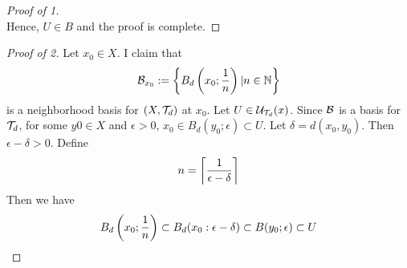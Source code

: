 \begin{prop}
\begin{proof}[Proof of 1]
\begin{equation}
        \end{equation}
        Hence, $U \in B$ and the proof is complete. 
    \end{proof}
    \begin{proof}[Proof of 2]
        Let $x_0 \in X$. 
        I claim that 
        \begin{equation}
            \mathcal{B}_{x_0}:= \left\{ B_d\left( x_0; \frac{1}{n}\right) | n \in \mathbb{N}\right\}
        \end{equation}
        is a neighborhood basis for $(X,\mathcal{T}_d)$ at $x_0$. 
        Let $U \in \mathcal{U}_{\mathcal{T}_d}(x)$. 
        Since $\mathcal{B}$ is a basis for $\mathcal{T}_d$, for some $y0 \in X$ and $\epsilon > 0$, 
        $x_0 \in B_d(y_0; \epsilon) \subset U$. 
        Let $\delta = d(x_0, y_0)$. Then $\epsilon - \delta > 0$. 
        Define
        \begin{equation}
            n = \left\lceil  \frac{1}{\epsilon - \delta} \right\rceil
        \end{equation}
        Then we have 
        \begin{equation}
            B_d\left( x_0 ; \frac{1}{n}\right) \subset B_d(x_0 : \epsilon - \delta) \subset B(y_0 ; \epsilon) \subset U
        \end{equation}
    \end{proof}
\end{prop}